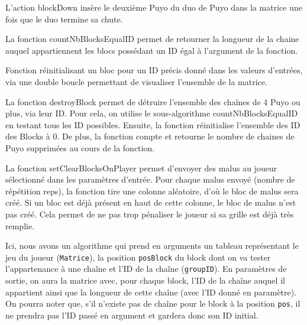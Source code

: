 \documentclass[11pt]{report}
\renewcommand{\tt}[1]{\texttt{#1}}
\begin{document}


L'action blockDown insère le deuxième Puyo du duo de Puyo dans la matrice une fois que le duo termine sa chute. 



La fonction countNbBlocksEqualID permet de retourner la longueur de la chaine auquel appartiennent les blocs possédant un ID égal à l’argument de la fonction.



Fonction réinitialisant un bloc pour un ID précis donné dans les valeurs d’entrées, via une double boucle permettant de visualiser l’ensemble de la matrice.



La fonction destroyBlock permet de détruire l’ensemble des chaînes de 4 Puyo ou plus, via leur ID. Pour cela, on utilise le sous-algorithme countNbBlocksEqualID en testant tous les ID possibles. Ensuite, la fonction réinitialise l’ensemble des ID des Blocks à 0.
De plus, la fonction compte et retourne le nombre de chaines de Puyo supprimées au cours de la fonction.



La fonction setClearBlocksOnPlayer permet d’envoyer des malus au joueur sélectionné dans les paramètres d’entrée. Pour chaque malus envoyé (nombre de répétition reps), la fonction tire une colonne aléatoire, d’où le bloc de malus sera créé. Si un bloc est déjà présent en haut de cette colonne, le bloc de malus n'est pas créé. Cela permet de ne pas trop pénaliser le joueur si sa grille est déjà très remplie.  





Ici, nous avons un algorithme qui prend en arguments un tableau représentant le jeu du joueur (\tt{Matrice}), la position \tt{posBlock} du block dont on va tester l'appartenance à une chaîne et l'ID de la chaîne (\tt{groupID}). En paramètres de sortie, on aura la matrice avec, pour chaque block, l'ID de la chaîne auquel il appartient ainsi que la longueur de cette chaîne (avec l'ID donné en paramètre). On pourra noter que, s'il n'existe pas de chaîne pour le block à la position \tt{pos}, il ne prendra pas l'ID passé en argument et gardera donc son ID initial. 
\end{document}
